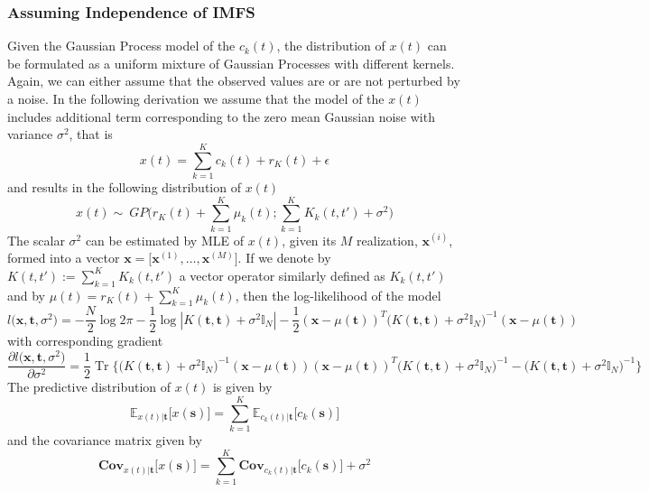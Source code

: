 \documentclass[article,moreauthors,pdftex,10pt,a4paper]{ssrn}
\DeclareMathOperator*{\tr}{\text{Tr}}
\begin{document}
\subsubsection{Assuming Independence of IMFS }
Given the Gaussian Process model of the $c_k(t)$, the distribution of $x(t)$ can be formulated as a uniform mixture of Gaussian Processes with different kernels.  Again, we can either assume that the observed values are or are not perturbed by a noise. In the following derivation we assume that the model of the $x(t)$ includes additional  term corresponding to the zero mean Gaussian noise with variance $\sigma^2$, that is
\begin{equation}
x(t) = \sum_{k = 1}^K c_k(t) + r_K(t) + \epsilon
\end{equation}
and results in the following distribution of $x(t)$ 
\begin{equation}
x(t) \sim ~   GP \bigg(r_K(t) + \sum_{k=1}^K \mu_k(t); \sum_{k=1}^K K_k(t,t') + \sigma^2 \bigg) 
\end{equation}
The scalar $\sigma^2$ can be estimated by MLE of $x(t)$, given its $M$ realization, $\mathbf{x}^{(i)}$, formed into a vector $\mathbf{x} = \big[\mathbf{x}^{(1)},\ldots, \mathbf{x}^{(M)} \big]$. If we denote by $K(t,t') := \sum_{k=1}^K K_k(t,t')$ a vector operator similarly defined as $K_k(t,t')$  and by $\mu(t) = r_K(t) + \sum_{k=1}^K \mu_k(t)$, then the log-likelihood of the model 
\begin{equation}
l\big( \mathbf{x}, \mathbf{t} , \sigma^2 \big) = - \frac{N}{2} \log 2 \pi - \frac{1}{2} \log |K(\mathbf{t},\mathbf{t}) + \sigma^2 \mathbb{I}_N | - \frac{1}{2}(\mathbf{x} - \mu(\mathbf{t}))^T \Big(K(\mathbf{t},\mathbf{t})   + \sigma^2 \mathbb{I}_N \Big)^{-1} (\mathbf{x} - \mu(\mathbf{t}))
\end{equation}
with corresponding gradient
\begin{equation*}
\frac{\partial l\big( \mathbf{x} , \mathbf{t} , \sigma^2 \big)}{\partial \sigma^2} = \frac{1}{2} \tr \bigg\{\Big(K(\mathbf{t},\mathbf{t}) + \sigma^2 \mathbb{I}_N\Big)^{-1}  (\mathbf{x} - \mu(\mathbf{t}))(\mathbf{x} - \mu(\mathbf{t}))^T\Big(K(\mathbf{t},\mathbf{t})  + \sigma^2 \mathbb{I}_N\Big)^{-1} -\Big(K(\mathbf{t},\mathbf{t})+ \sigma^2 \mathbb{I}_N\Big)^{-1}  \bigg\} 
\end{equation*}
The predictive distribution of $x(t)$ is given by 
\begin{equation*}
\mathbb{E}_{x(t)| \mathbf{t}} \big[x(\mathbf{s})] = \sum_{k = 1}^K \mathbb{E}_{c_k(t)|\mathbf{t}} \big[c_k(\mathbf{s})] 
\end{equation*}
and the covariance matrix given by
\begin{equation*}
\mathbf{Cov}_{x(t)|\mathbf{t}} \big[x(\mathbf{s})]  = \sum_{k = 1}^K\mathbf{Cov}_{c_k(t)|\mathbf{t}} \big[c_k(\mathbf{s})]  + \sigma^2
\end{equation*}
\end{document}
